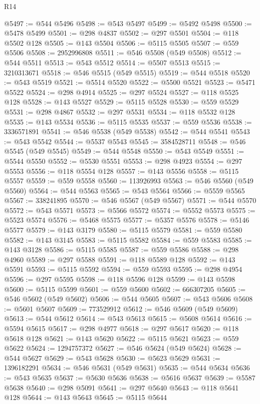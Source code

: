 \begin{lexlean}{R14}
\begin{coremodule}
@5497 := @544 @5496
@5498 := @543 @5497
@5499 := @5492 @5498
@5500 := @5478 @5499
@5501 := @298 @4837
@5502 := @297 @5501
@5504 := @118 @5502 @128
@5505 := @143 @5504
@5506 := @5115 @5505
@5507 := @559 @5506
@5508 := 2952996808
@5511 := @546 @5508 (@549 @5508)
@5512 := @544 @5511
@5513 := @543 @5512
@5514 := @5507 @5513
@5515 := 3210313671
@5518 := @546 @5515 (@549 @5515)
@5519 := @544 @5518
@5520 := @543 @5519
@5521 := @5514 @5520
@5522 := @5500 @5521
@5523 := @5471 @5522
@5524 := @298 @4914
@5525 := @297 @5524
@5527 := @118 @5525 @128
@5528 := @143 @5527
@5529 := @5115 @5528
@5530 := @559 @5529
@5531 := @298 @4867
@5532 := @297 @5531
@5534 := @118 @5532 @128
@5535 := @143 @5534
@5536 := @5115 @5535
@5537 := @559 @5536
@5538 := 3336571891
@5541 := @546 @5538 (@549 @5538)
@5542 := @544 @5541
@5543 := @543 @5542
@5544 := @5537 @5543
@5545 := 3584528711
@5548 := @546 @5545 (@549 @5545)
@5549 := @544 @5548
@5550 := @543 @5549
@5551 := @5544 @5550
@5552 := @5530 @5551
@5553 := @298 @4923
@5554 := @297 @5553
@5556 := @118 @5554 @128
@5557 := @143 @5556
@5558 := @5115 @5557
@5559 := @559 @5558
@5560 := 113926993
@5563 := @546 @5560 (@549 @5560)
@5564 := @544 @5563
@5565 := @543 @5564
@5566 := @5559 @5565
@5567 := 338241895
@5570 := @546 @5567 (@549 @5567)
@5571 := @544 @5570
@5572 := @543 @5571
@5573 := @5566 @5572
@5574 := @5552 @5573
@5575 := @5523 @5574
@5576 := @5468 @5575
@5577 := @5357 @5576
@5578 := @5146 @5577
@5579 := @143 @3179
@5580 := @5115 @5579
@5581 := @559 @5580
@5582 := @143 @3145
@5583 := @5115 @5582
@5584 := @559 @5583
@5585 := @143 @3128
@5586 := @5115 @5585
@5587 := @559 @5586
@5588 := @298 @4960
@5589 := @297 @5588
@5591 := @118 @5589 @128
@5592 := @143 @5591
@5593 := @5115 @5592
@5594 := @559 @5593
@5595 := @298 @4954
@5596 := @297 @5595
@5598 := @118 @5596 @128
@5599 := @143 @5598
@5600 := @5115 @5599
@5601 := @559 @5600
@5602 := 666307205
@5605 := @546 @5602 (@549 @5602)
@5606 := @544 @5605
@5607 := @543 @5606
@5608 := @5601 @5607
@5609 := 773529912
@5612 := @546 @5609 (@549 @5609)
@5613 := @544 @5612
@5614 := @543 @5613
@5615 := @5608 @5614
@5616 := @5594 @5615
@5617 := @298 @4977
@5618 := @297 @5617
@5620 := @118 @5618 @128
@5621 := @143 @5620
@5622 := @5115 @5621
@5623 := @559 @5622
@5624 := 1294757372
@5627 := @546 @5624 (@549 @5624)
@5628 := @544 @5627
@5629 := @543 @5628
@5630 := @5623 @5629
@5631 := 1396182291
@5634 := @546 @5631 (@549 @5631)
@5635 := @544 @5634
@5636 := @543 @5635
@5637 := @5630 @5636
@5638 := @5616 @5637
@5639 := @5587 @5638
@5640 := @298 @5091
@5641 := @297 @5640
@5643 := @118 @5641 @128
@5644 := @143 @5643
@5645 := @5115 @5644

\end{coremodule}
\end{lexlean}
